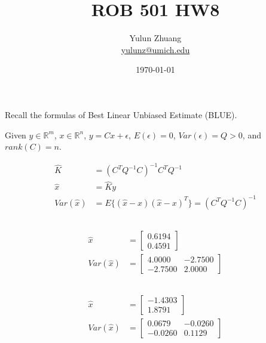\documentclass{article}
\title{ROB 501 HW8}
\author{Yulun Zhuang \\ \href{mailto:yulunz@umich.edu}{yulunz@umich.edu}}
\date{\today}
\theoremstyle{definition} %
\newcommand{\RR}{\mathbb{R}}
\begin{document}
\maketitle

\section{}

Recall the formulas of Best Linear Unbiased Estimate (BLUE).

Given $y\in \RR^m$, $x\in \RR^n$, $y = Cx+\epsilon$, $E(\epsilon)=0$, $Var(\epsilon) = Q > 0$, and $rank(C)=n$.

\begin{align*}
    \hat K &= (C^TQ^{-1}C)^{-1}C^TQ^{-1}\\
    \hat x &= \hat K y\\
    Var(\hat x) &= E\{(\hat x-x)(\hat x - x)^T\} = (C^TQ^{-1}C)^{-1}
\end{align*}

\subsection{}

\begin{align*}
    \hat x &= 
    \begin{bmatrix}
        0.6194\\
        0.4591
    \end{bmatrix}\\
    Var(\hat x) &=
    \begin{bmatrix}
        4.0000&-2.7500\\
        -2.7500&2.0000
    \end{bmatrix}
\end{align*}

\subsection{}

\begin{align*}
    \hat x &= 
    \begin{bmatrix}
        -1.4303\\
        1.8791
    \end{bmatrix}\\
    Var(\hat x) &=
    \begin{bmatrix}
        0.0679&-0.0260\\
        -0.0260&0.1129
    \end{bmatrix}
\end{align*}
\end{document}
